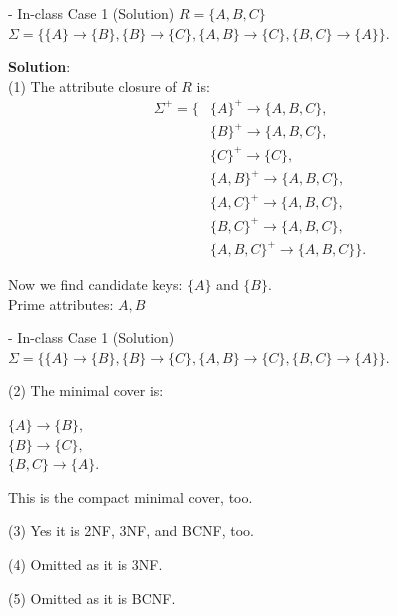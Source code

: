 \begin{frame}[fragile]{ - In-class Case 1 (Solution)}
	$R=\{A, B, C\}$\\ 
	$\Sigma=\{\{A\} \rightarrow \{B\},\{B\} \rightarrow \{C\}, \{A, B\} \rightarrow \{C\},\{B, C\} \rightarrow \{A\}\}.$\\\vspace{5pt}
	
	\textbf{Solution}:\\
	(1) The attribute closure of $R$ is:
	\begin{align*} 
		\Sigma^{+} = \{&\{A\}^{+} \rightarrow \{A,B,C\},\\
		&\{B\}^{+} \rightarrow \{A,B,C\},\\
		&\{C\}^{+} \rightarrow \{C\},\\
		&\{A,B\}^{+} \rightarrow \{A,B,C\},\\
		&\{A,C\}^{+} \rightarrow \{A,B,C\},\\
		&\{B,C\}^{+} \rightarrow \{A,B,C\},\\
		&\{A,B,C\}^{+} \rightarrow \{A,B,C\}\}.
	\end{align*} 
	
	Now we find candidate keys: $\{A\}$ and $\{B\}$.\\
	Prime attributes: $A, B$
\end{frame}

\begin{frame}[fragile]{ - In-class Case 1 (Solution)}
	$\Sigma=\{\{A\} \rightarrow \{B\},\{B\} \rightarrow \{C\}, \{A, B\} \rightarrow \{C\},\{B, C\} \rightarrow \{A\}\}.$\\\vspace{25pt}
	
	(2) The minimal cover is:\\\vspace{5pt}
	
	$\{A\} \rightarrow \{B\},$\\
	$\{B\}  \rightarrow \{C\},$\\
	$\{B,C\} \rightarrow \{A\}.$\\\vspace{5pt}
	
	This is the compact minimal cover, too.\\\vspace{5pt}
	
	(3)  Yes it is 2NF, 3NF, and BCNF, too.\\\vspace{5pt}
	
	(4) Omitted as it is 3NF. \\\vspace{5pt}
	
	(5) Omitted as it is BCNF. \\\vspace{5pt}
	
\end{frame}

